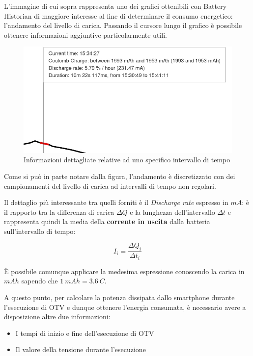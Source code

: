 L'immagine di cui sopra rappresenta uno dei grafici ottenibili con Battery Historian di maggiore interesse al fine di
determinare il consumo energetico: l'andamento del livello di carica. Passando il cursore lungo il grafico è possibile
ottenere informazioni aggiuntive particolarmente utili.

\begin{figure}[h!]
    \begin{center}
        \includegraphics[scale=0.35]{img/battery_historian_hover.jpg}
        \caption{Informazioni dettagliate relative ad uno specifico intervallo di tempo}
    \end{center}
\end{figure}

Come si può in parte notare dalla figura, l'andamento è discretizzato con dei campionamenti del livello di carica ad 
intervalli di tempo non regolari.

Il dettaglio più interessante tra quelli forniti è il \textit{Discharge rate} espresso in $mA$: è il rapporto tra la differenza
di carica $\Delta Q$ e la lunghezza dell'intervallo $\Delta t$ e rappresenta quindi la media della \textbf{corrente in uscita} 
dalla batteria sull'intervallo di tempo:

\begin{equation*}
    I_{i} = \frac{\Delta Q_i}{\Delta t_i}
\end{equation*}

È possibile comunque applicare la medesima espressione conoscendo la carica in $mAh$ sapendo che $1~mAh = 3.6~C$.

A questo punto, per calcolare la potenza dissipata dallo smartphone durante l'esecuzione di OTV e dunque ottenere l'energia 
consumata, è necessario avere a disposizione altre due informazioni:
\begin{itemize}
    \item I tempi di inizio e fine dell'esecuzione di OTV
    \item Il valore della tensione durante l'esecuzione
\end{itemize}

